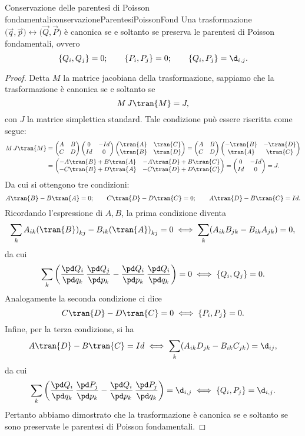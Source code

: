 \begin{prop}{Conservazione delle parentesi di Poisson fondamentali}{conservazioneParentesiPoissonFond}
	Una trasformazione \(\big(\vec{q},\vec{p}\big) \longleftrightarrow \big(\vec{Q},\vec{P}\big)\) è canonica se e soltanto se preserva le parentesi di Poisson fondamentali, ovvero
	\[
		\{Q_i,Q_j\} = 0; \qquad \{P_i,P_j\} = 0; \qquad \{Q_i,P_j\} = \d_{i,j}.
	\]
\end{prop}

\begin{proof}
	Detta \(M\) la matrice jacobiana della trasformazione, sappiamo che la trasformazione è canonica se e soltanto se 
	\[
		M\,J \tran{M} = J,
	\]
	con \(J\) la matrice simplettica standard. Tale condizione può essere riscritta come segue:
	\[
		\begin{split}
			M\,J\tran{M} & = \begin{pmatrix}A & B\\C & D\end{pmatrix} \begin{pmatrix}0 & -Id\\Id & 0\end{pmatrix} \begin{pmatrix}\tran{A} & \tran{C}\\\tran{B} & \tran{D}\end{pmatrix} = \begin{pmatrix}A & B\\C & D\end{pmatrix} \begin{pmatrix}-\tran{B} & -\tran{D}\\\tran{A} & \tran{C}\end{pmatrix}\\
			& = \begin{pmatrix}
				-A\tran{B} + B\tran{A} & -A\tran{D} + B\tran{C} \\
				-C\tran{B} + D\tran{A} & -C\tran{D} + D\tran{C}
			\end{pmatrix} = \begin{pmatrix}0 & -Id\\Id & 0\end{pmatrix} = J.
		\end{split}
	\]
	Da cui si ottengono tre condizioni:
	\[
		A\tran{B} - B\tran{A} = 0; \qquad C\tran{D} - D\tran{C} = 0; \qquad A\tran{D} - B\tran{C} = Id.
	\]
	Ricordando l'espressione di \(A,B\), la prima condizione diventa
	\[
		\sum_k A_{ik} {(\tran{B})}_{kj} - B_{ik} {(\tran{A})}_{kj} = 0 \iff \sum_k (A_{ik} B_{jk} - B_{ik} A_{jk}) = 0,
	\]
	da cui
	\[
		\sum_k \bigg(\frac{\pd Q_i}{\pd q_k}\,\frac{\pd Q_j}{\pd p_k} - \frac{\pd Q_i}{\pd p_k}\,\frac{\pd Q_i}{\pd q_k}\bigg) = 0 \iff \{Q_i,Q_j\} = 0.
	\]
	Analogamente la seconda condizione ci dice
	\[
		C\tran{D} - D\tran{C} = 0 \iff \{P_i,P_j\} = 0.
	\]
	Infine, per la terza condizione, si ha
	\[
		A\tran{D} - B\tran{C} = Id \iff \sum_k (A_{ik} D_{jk} - B_{ik} C_{jk}) = \d_{ij},
	\]
	da cui
	\[
		\sum_k \bigg(\frac{\pd Q_i}{\pd q_k}\,\frac{\pd P_j}{\pd p_k} - \frac{\pd Q_i}{\pd p_k}\,\frac{\pd P_j}{\pd q_k}\bigg) = \d_{i,j} \iff \{Q_i,P_j\} = \d_{i,j}.
	\]
	Pertanto abbiamo dimostrato che la trasformazione è canonica se e soltanto se sono preservate le parentesi di Poisson fondamentali.
\end{proof}
